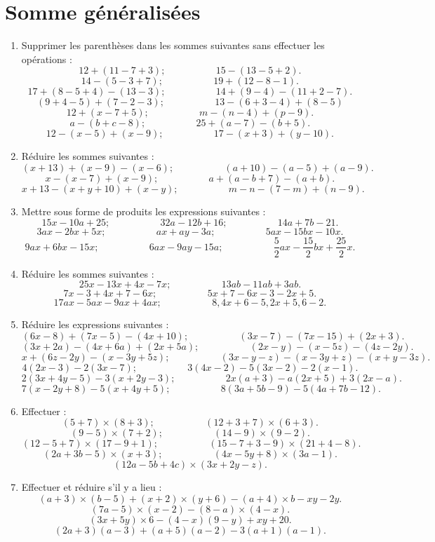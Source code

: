 \chapter{Somme généralisées}
 \begin{enumerate}
 \item Supprimer les parenthèses dans les sommes suivantes sans effectuer les opérations : 
 \[ 12 + (11 - 7 + 3) ; \phantom{meowmeow} 15 - (13 - 5 + 2).\]
 \[ 14 - ( 5 - 3 + 7); \phantom{meowmeow} 19 + (12 - 8 - 1). \]
 \[ 17 + ( 8 - 5 + 4) - (13 -3); \phantom{meowmeow} 14 + (9 - 4) - (11 + 2 - 7).\]
 \[(9 + 4 - 5) + (7 - 2 - 3); \phantom{meowmeow} 13 - (6 + 3 - 4) + ( 8 - 5)\]
 \[ 12 + ( x - 7 + 5); \phantom{meowmeow} m - (n - 4) + (p - 9).\]
 \[ a - (b + c - 8); \phantom{meowmeow} 25 + (a - 7)  - (b + 5).\]
 \[ 12 - (x - 5) + (x - 9); \phantom{meowmeow} 17 - (x + 3) + (y - 10).\]
 \item Réduire les sommes suivantes : 
 \[ (x + 13) + (x - 9) - (x - 6); \phantom{meowmeow} 
 (a + 10) - (a - 5) + (a - 9). \]
 \[ x - (x - 7)  + (x - 9); \phantom{meowmeow} 
 a + (a - b + 7) - (a + b). \]
 \[ x + 13 - (x + y + 10) + (x - y); \phantom{meowmeow} 
 m - n - (7 - m) + (n - 9).\]
 \item Mettre sous forme de produits les expressions suivantes : 
\[ 15 x -10 a + 25; \phantom{meowmeow} 32 a - 12 b + 16; \phantom{meowmeow}
14a + 7b - 21.\]
\[ 3ax-2bx + 5x; \phantom{meowmeow} ax + ay - 3a; \phantom{meowmeow}
5ax - 15 bx - 10x.\]
\[ 9ax + 6bx - 15x; \phantom{meowmeow} 6ax - 9ay - 15 a; \phantom{meowmeow}
\frac52 ax - \frac{15}2bx + \frac{25}2 x. \]
\item Réduire les sommes suivantes : 
\[25x - 13 x + 4x - 7x; \phantom{meowmeow} 13 ab - 11 ab + 3ab. \]
\[ 7x - 3 + 4x +7 - 6x; \phantom{meowmeow} 5x + 7 - 6x - 3 - 2x + 5.\]
\[ 17 ax - 5ax - 9ax + 4ax ; \phantom{meowmeow} 8,4x + 6 - 5,2x + 5,6 - 2.\]
\item Réduire les expressions suivantes : 
\[ (6x - 8) + (7x - 5) - (4x + 10); \phantom{meowmeow} (3x -7) - (7x - 15)
+ (2x + 3).\]
\[ (3x + 2a) - (4x + 6a) + (2x + 5a); \phantom{meowmeow} (2x - y) - (x - 5z)
- (4z - 2y). \]
\[ x + (6z - 2y) - (x - 3y + 5z); \phantom{meowmeow} (3x - y - z) - (x - 3y + z) - (x + y - 3z).\]
\[ 4(2x - 3) - 2(3x - 7); \phantom{meowmeow} 3(4x - 2)- 5(3x - 2) - 2(x -1).\]
\[2(3x + 4y - 5) - 3(x + 2y - 3) ; \phantom{meowmeow} 2x(a + 3) - a(2x +  5)
+ 3(2x -a).\]
\[7(x - 2y + 8) - 5(x + 4y + 5); \phantom{meowmeow} 8(3a + 5b - 9)
- 5(4a + 7b - 12). \]
\item Effectuer :
\[ (5 + 7)\times(8 + 3); \phantom{meowmeow} (12 + 3 + 7) \times (6 + 3).\]
\[ (9 - 5) \times (7 + 2) ; \phantom{meowmeow} (14 - 9)\times (9 - 2).\]
\[ (12 - 5 + 7) \times (17 - 9 + 1) ; \phantom{meowmeow} (15 - 7 + 3 - 9) \times (21 + 4 - 8). \]
\[ (2a + 3b - 5) \times (x + 3); \phantom{meowmeow} (4x - 5y + 8) \times (3a -1).\]
\[ (12a - 5b + 4c) \times (3x + 2y - z).\]
\item Effectuer et réduire s'il y a lieu : 
\[ (a + 3)\times(b -5)+ (x + 2)\times(y + 6) - (a + 4)\times b - xy - 2y.\]
\[(7a - 5)\times(x - 2) - (8 - a)\times(4 - x).\]
\[(3x + 5y)\times 6 - (4 - x)(9 - y) + xy + 20.\]
\[ (2a + 3)(a - 3) + (a + 5)(a - 2) - 3(a + 1)(a - 1).\]
 \end{enumerate}